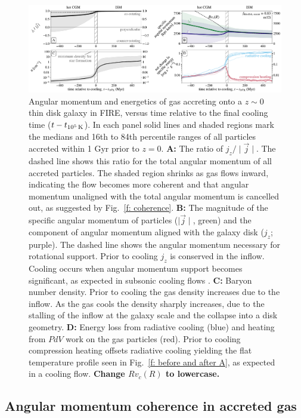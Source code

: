 \documentclass[fleqn,usenatbib]{mnras}
\newcommand{\tcon}{t_{10^5\,{\rm K}}}
\begin{document}
\begin{figure}
\includegraphics[width=\textwidth]{figures/before_and_after/before_and_after_m12i_md.pdf}
\caption{
Angular momentum and energetics of gas accreting onto a $z\sim0$ thin disk galaxy in FIRE, versus time relative to the final cooling time ($t - \tcon$).
In each panel solid lines and shaded regions mark the medians and 16th to 84th percentile ranges of all particles accreted within 1 Gyr prior to $z=0$.
\textbf{A:}
The ratio of $j_z / \mid \vec j \mid$.
The dashed line shows this ratio for the total angular momentum of all accreted particles.
The shaded region shrinks as gas flows inward, indicating the flow becomes more coherent and that angular momentum unaligned with the total angular momentum is cancelled out, as suggested by Fig.~\ref{f: coherence}. 
\textbf{B:}
The magnitude of the specific angular momentum of particles ($\mid\vec{j}\mid$, green) and the component of angular momentum aligned with the galaxy disk ($j_z$; purple).
The dashed line shows the angular momentum necessary for rotational support.
Prior to cooling $j_z$ is conserved in the inflow.
Cooling occurs when angular momentum support becomes significant, as expected in subsonic cooling flows \citep{Cowie1980, Stern2019}.
\textbf{C:}
Baryon number density.
Prior to cooling the gas density increases due to the inflow.
As the gas cools the density sharply increases, due to the stalling of the inflow at the galaxy scale and the collapse into a disk geometry. 
\textbf{D:}
Energy loss from radiative cooling (blue) and heating from $PdV$ work on the gas particles (red).
Prior to cooling compression heating offsets radiative cooling yielding the flat temperature profile seen in Fig.~\ref{f: before and after A}, as expected in a cooling flow. 
\textbf{Change $Rv_c(R)$ to lowercase.}
}
\label{f: before and after B}
\end{figure}




\subsection{Angular momentum coherence in accreted gas}
\label{s: mechanics -- coherence}
\end{document}
